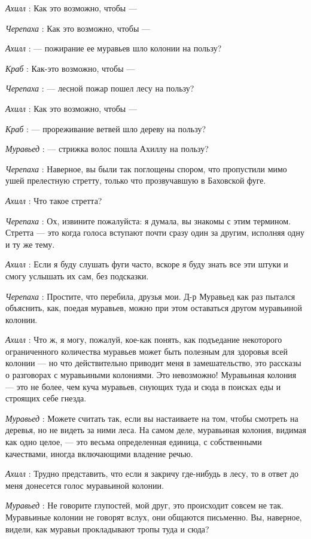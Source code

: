 \documentclass[../main.tex]{subfiles}
\begin{document}
\begin{dialogue}
\emph{Ахилл} : Как это возможно, чтобы ---

\emph{Черепаха} : Как это возможно, чтобы ---

\emph{Ахилл} : --- пожирание ее муравьев шло колонии на пользу?

\emph{Краб} : Как-это возможно, чтобы ---

\emph{Черепаха} : --- лесной пожар пошел лесу на пользу?

\emph{Ахилл} : Как это возможно, чтобы ---

\emph{Краб} : --- прореживание ветвей шло дереву на пользу?

\emph{Муравьед} : --- стрижка волос пошла Ахиллу на пользу?

\emph{Черепаха} : Наверное, вы были так поглощены спором, что пропустили мимо ушей прелестную стретту, только что прозвучавшую в Баховской фуге.

\emph{Ахилл} : Что такое стретта?

\emph{Черепаха} : Ох, извините пожалуйста: я думала, вы знакомы с этим термином. Стретта --- это когда голоса вступают почти сразу один за другим, исполняя одну и ту же тему.

\emph{Ахилл} : Если я буду слушать фуги часто, вскоре я буду знать все эти штуки и смогу услышать их сам, без подсказки.

\emph{Черепаха} : Простите, что перебила, друзья мои. Д-р Муравьед как раз пытался объяснить, как, поедая муравьев, можно при этом оставаться другом муравьиной колонии.

\emph{Ахилл} : Что ж, я могу, пожалуй, кое-как понять, как подъедание некоторого ограниченного количества муравьев может быть полезным для здоровья всей колонии --- но что действительно приводит меня в замешательство, это рассказы о разговорах с муравьиными колониями. Это невозможно! Муравьиная колония --- это не более, чем куча муравьев, снующих туда и сюда в поисках еды и строящих себе гнезда.

\emph{Муравьед} : Можете считать так, если вы настаиваете на том, чтобы смотреть на деревья, но не видеть за ними леса. На самом деле, муравьиная колония, видимая как одно целое, --- это весьма определенная единица, с собственными качествами, иногда включающими владение речью.

\emph{Ахилл} : Трудно представить, что если я закричу где-нибудь в лесу, то в ответ до меня донесется голос муравьиной колонии.

\emph{Муравьед} : Не говорите глупостей, мой друг, это происходит совсем не так. Муравьиные колонии не говорят вслух, они общаются письменно. Вы, наверное, видели, как муравьи прокладывают тропы туда и сюда?


\end{dialogue}
\end{document}
